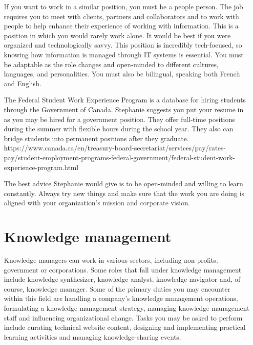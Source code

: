 \documentclass[
  letterpaper,
  DIV=11,
  numbers=noendperiod]{scrreprt}
\begin{document}
\begin{tcolorbox}
If you want to work in a similar position, you must be a people person.
The job requires you to meet with clients, partners and collaborators
and to work with people to help enhance their experience of working with
information. This is a position in which you would rarely work alone. It
would be best if you were organized and technologically savvy. This
position is incredibly tech-focused, so knowing how information is
managed through IT systems is essential. You must be adaptable as the
role changes and open-minded to different cultures, languages, and
personalities. You must also be bilingual, speaking both French and
English.

The Federal Student Work Experience Program is a database for hiring
students through the Government of Canada. Stephanie suggests you put
your resume in as you may be hired for a government position. They offer
full-time positions during the summer with flexible hours during the
school year. They also can bridge students into permanent positions
after they graduate.\\
https://www.canada.ca/en/treasury-board-secretariat/services/pay/rates-pay/student-employment-programs-federal-government/federal-student-work-experience-program.html

The best advice Stephanie would give is to be open-minded and willing to
learn constantly. Always try new things and make sure that the work you
are doing is aligned with your organization's mission and corporate
vision.

\end{tcolorbox}

\section{Knowledge management}\label{knowledge-management}

Knowledge managers can work in various sectors, including non-profits,
government or corporations. Some roles that fall under knowledge
management include knowledge synthesizer, knowledge analyst, knowledge
navigator and, of course, knowledge manager. Some of the primary duties
you may encounter within this field are handling a company's knowledge
management operations, formulating a knowledge management strategy,
managing knowledge management staff and influencing organizational
change. Tasks you may be asked to perform include curating technical
website content, designing and implementing practical learning
activities and managing knowledge-sharing events.
\end{document}
